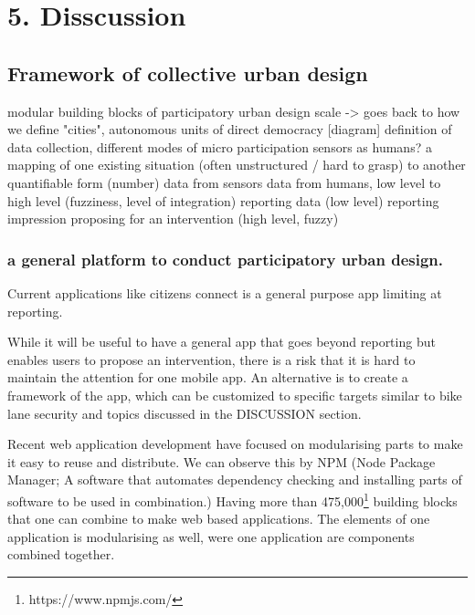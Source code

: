 \chapter{5. Disscussion}

\section{Framework of collective urban design}
modular building blocks of participatory urban design
scale -> goes back to how we define "cities", autonomous units of direct democracy
[diagram]
definition of data collection, different modes of micro participation
sensors as humans?
a mapping of one existing situation (often unstructured / hard to grasp) to another quantifiable form (number)
data from sensors
data from humans, low level to high level (fuzziness, level of integration)
reporting data (low level)
reporting impression
proposing for an intervention (high level, fuzzy)
\subsection{a general platform to conduct participatory urban design.}
Current applications like citizens connect is a general purpose app limiting at reporting. 

While it will be useful to have a general app that goes beyond reporting but enables users to propose an intervention, there is a risk that it is hard to maintain the attention for one mobile app. An alternative is to create a framework of the app, which can be customized to specific targets similar to bike lane security and topics discussed in the DISCUSSION section.

Recent web application development have focused on modularising parts to make it easy to reuse and distribute. We can observe this by NPM (Node Package Manager; A software that automates dependency checking and installing parts of software to be used in combination.) Having more than 475,000\footnote{https://www.npmjs.com/} building blocks that one can combine to make web based applications. The elements of one application is modularising as well, were one application are components combined together.

